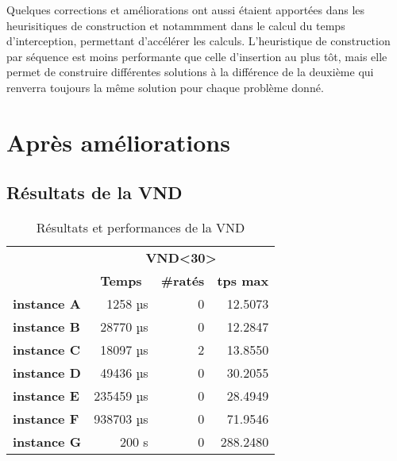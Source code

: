     	Quelques corrections et améliorations ont aussi étaient apportées dans les heurisitiques de construction et notammment dans le calcul du temps d'interception, permettant d'accélérer les calculs. L'heuristique de construction par séquence est moins performante que celle d'insertion au plus tôt, mais elle permet de construire différentes solutions à la différence de la deuxième qui renverra toujours la même solution pour chaque problème donné.
    	
    \section{Après améliorations}
    	\subsection{Résultats de la VND}

        \begin{table}[H]
            \centering
            \begin{tabular}{l|r|r|r|}
            \cline{2-4}
            \multirow{2}{*}{}                         & \multicolumn{3}{c|}{\textbf{VND\textless30\textgreater}}                                                            \\ \cline{2-4} 
                                                      & \multicolumn{1}{c|}{\textbf{Temps}} & \multicolumn{1}{c|}{\textbf{\#ratés}} & \multicolumn{1}{c|}{\textbf{tps max}} \\ \hline
            \multicolumn{1}{|l|}{\textbf{instance A}} & 1258 µs                             & 0                                     & 12.5073                               \\ \hline
            \multicolumn{1}{|l|}{\textbf{instance B}} & 28770 µs                            & 0                                     & 12.2847                               \\ \hline
            \multicolumn{1}{|l|}{\textbf{instance C}} & 18097 µs                            & 2                                     & 13.8550                               \\ \hline
            \multicolumn{1}{|l|}{\textbf{instance D}} & 49436 µs                            & 0                                     & 30.2055                               \\ \hline
            \multicolumn{1}{|l|}{\textbf{instance E}} & 235459 µs                           & 0                                     & 28.4949                               \\ \hline
            \multicolumn{1}{|l|}{\textbf{instance F}} & 938703 µs                           & 0                                     & 71.9546                               \\ \hline
            \multicolumn{1}{|l|}{\textbf{instance G}} & 200 s                               & 0                                     & 288.2480                                       \\ \hline
            \end{tabular}
            \caption{Résultats et performances de la VND}
            \label{tab:vnd-perf}
        \end{table}

